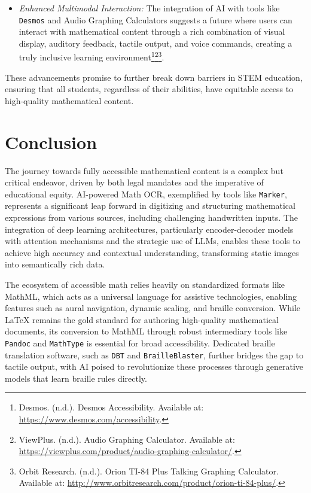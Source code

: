 \begin{itemize}
    \item \emph{Enhanced Multimodal Interaction:} The integration of AI with tools like \texttt{Desmos} and Audio Graphing Calculators suggests a future where users can interact with mathematical content through a rich combination of visual display, auditory feedback, tactile output, and voice commands, creating a truly inclusive learning environment\footnote{Desmos. (n.d.). Desmos Accessibility. Available at: \url{https://www.desmos.com/accessibility}.}\footnote{ViewPlus. (n.d.). Audio Graphing Calculator. Available at: \url{https://viewplus.com/product/audio-graphing-calculator/}.}\footnote{Orbit Research. (n.d.). Orion TI-84 Plus Talking Graphing Calculator. Available at: \url{http://www.orbitresearch.com/product/orion-ti-84-plus/}.}.
\end{itemize}
These advancements promise to further break down barriers in STEM education, ensuring that all students, regardless of their abilities, have equitable access to high-quality mathematical content.

\section{Conclusion}\label{sec:conclusion-mathocr}
The journey towards fully accessible mathematical content is a complex but critical endeavor, driven by both legal mandates and the imperative of educational equity. AI-powered Math OCR, exemplified by tools like \texttt{Marker}, represents a significant leap forward in digitizing and structuring mathematical expressions from various sources, including challenging handwritten inputs. The integration of deep learning architectures, particularly encoder-decoder models with attention mechanisms and the strategic use of LLMs, enables these tools to achieve high accuracy and contextual understanding, transforming static images into semantically rich data.

The ecosystem of accessible math relies heavily on standardized formats like MathML, which acts as a universal language for assistive technologies, enabling features such as aural navigation, dynamic scaling, and braille conversion. While LaTeX remains the gold standard for authoring high-quality mathematical documents, its conversion to MathML through robust intermediary tools like \texttt{Pandoc} and \texttt{MathType} is essential for broad accessibility. Dedicated braille translation software, such as \texttt{DBT} and \texttt{BrailleBlaster}, further bridges the gap to tactile output, with AI poised to revolutionize these processes through generative models that learn braille rules directly.

